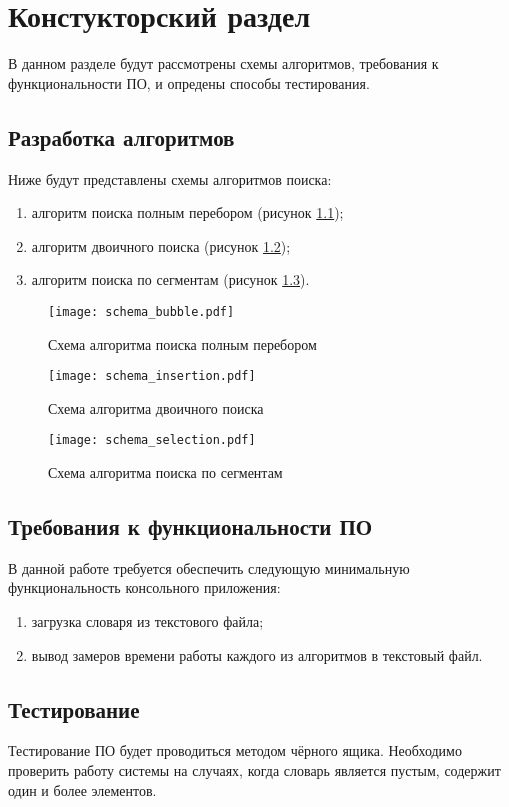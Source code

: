 \chapter{ Констукторский раздел}
\label{cha:design}
    В данном разделе будут рассмотрены схемы алгоритмов, требования к функциональности ПО,
    и опредены способы тестирования.
    
    \section{Разработка алгоритмов}
        Ниже будут представлены схемы алгоритмов поиска: \begin{enumerate}
            \item алгоритм поиска полным перебором (рисунок \ref{schema:search:brute-force});
            \item алгоритм двоичного поиска  (рисунок \ref{schema:search:binary});
            \item алгоритм поиска по сегментам (рисунок \ref{schema:search:segment}).
        \end{enumerate}

    \begin{figure}[h!]
        \centering
            \texttt{[image: schema\_bubble.pdf]}
            \caption{Схема алгоритма поиска полным перебором}
            \label{schema:search:brute-force}
    \end{figure}

    \begin{figure}[h!]
        \centering
            \texttt{[image: schema\_insertion.pdf]}
            \caption{Схема алгоритма двоичного поиска}
            \label{schema:search:binary}
    \end{figure}

    \begin{figure}[h!]
        \centering
            \texttt{[image: schema\_selection.pdf]}
            \caption{Схема алгоритма поиска по сегментам}
            \label{schema:search:segment}
    \end{figure}

    \section{Требования к функциональности ПО}
        В данной работе требуется обеспечить следующую минимальную функциональность консольного приложения:
        \begin{enumerate}
            \item загрузка словаря из текстового файла;
            \item вывод замеров времени работы каждого из алгоритмов в текстовый файл.
        \end{enumerate}

    \section{Тестирование}
        Тестирование ПО будет проводиться методом чёрного ящика. Необходимо проверить работу системы 
        на случаях, когда словарь является пустым, содержит один и более элементов.

\newpage